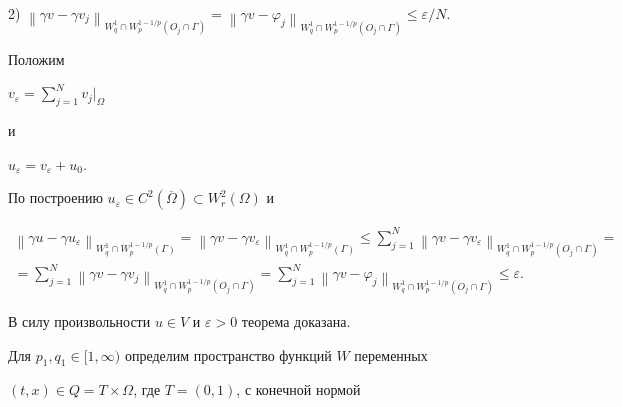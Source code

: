 2) $ {\left\| {\gamma v- \gamma v _j}


\right\|}_{W_q^1\cap W_p^{1-1/p}(O_j\cap\Gamma)} =


{\left\| {\gamma v-\varphi _j}


\right\|}_{W_q^1\cap W_p^{1-1/p}(O_j\cap\Gamma)}


\le \varepsilon /N$.





\noindent{}Положим


$v_\varepsilon = \sum \limits_{j=1}^{N} v_j |_\Omega$


и


$u_\varepsilon = v_\varepsilon + u_0$.


По построению $u_\varepsilon \in C^2(\overline{\Omega})


\subset W_r^2(\Omega)$ и


\begin{multline*}


{\left\| {\gamma u-\gamma u_\varepsilon}


\right\|}_{W_q^1\cap W_p^{1-1/p}(\Gamma)} =


{\left\| {\gamma v-\gamma v _\varepsilon}


\right\|}_{W_q^1\cap W_p^{1-1/p}(\Gamma)} \le


\sum \limits_{j=1}^{N} {\left\| {\gamma v-\gamma v_\varepsilon}


\right\|}_{W_q^1 \cap W_p^{1-1/p}(O_j\cap\Gamma)} = \\ =


\sum \limits_{j=1}^{N} {\left\| {\gamma v-\gamma v_j} \right\|}_{W_q^1


\cap W_p^{1-1/p}(O_j\cap\Gamma)} =


\sum \limits_{j=1}^{N} {\left\| {\gamma v-\varphi _j} \right\|}_{W_q^1


\cap W_p^{1-1/p}(O_j\cap\Gamma)} \le \varepsilon.


\end{multline*}


В силу произвольности $u \in V$ и $\varepsilon >0$ теорема доказана.


\medskip








Для $p_1,q_1\in [1,\infty)$ определим пространство функций $W$ переменных


$(t,x) \in Q=T \times \Omega$, где $T=(0,1)$, с конечной нормой


